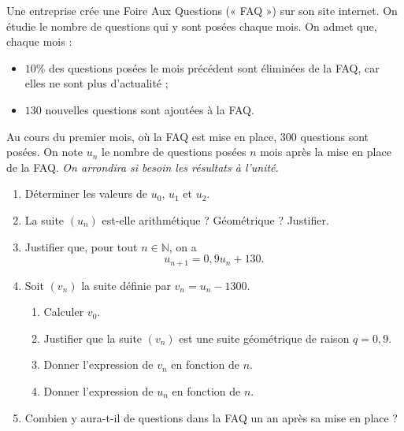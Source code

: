 \documentclass[11pt]{article}
\begin{document}
Une entreprise crée une Foire Aux Questions (« FAQ ») sur son site
internet. On étudie le nombre de questions qui y sont posées chaque mois. On
admet que, chaque mois :
\begin{itemize}
  \item $10$\% des questions posées le mois précédent sont éliminées de la FAQ,
    car elles ne sont plus d'actualité ;
  \item $130$ nouvelles questions sont ajoutées à la FAQ.
\end{itemize}
Au cours du premier mois, où la FAQ est mise en place, $300$ questions sont
posées. On note $u_n$ le nombre de questions posées $n$ mois après la mise en
place de la FAQ. \emph{On arrondira si besoin les résultats à l'unité.}
\begin{enumerate}
  \item Déterminer les valeurs de $u_0$, $u_1$ et $u_2$.
  \item La suite $\left( u_n \right)$ est-elle arithmétique ? Géométrique ? Justifier.
  \item Justifier que, pour tout $n\in\mathbb{N}$, on a 
    \[
      u_{n+1} = 0,9u_n+130.
    \]
  \item Soit $\left( v_n \right)$ la suite définie par $v_n = u_n - 1300$.
    \begin{enumerate}
      \item Calculer $v_0$.
      \item Justifier que la suite $\left( v_n \right)$ est une suite
        géométrique de raison $q=0,9$.
      \item Donner l'expression de $v_n$ en fonction de $n$.
      \item Donner l'expression de $u_n$ en fonction de $n$.
    \end{enumerate}
  \item Combien y aura-t-il de questions dans la FAQ un an après sa mise en
    place ?
\end{enumerate}
\end{document}
